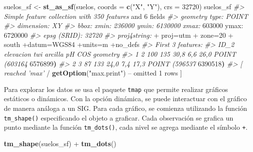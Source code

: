 \documentclass[11pt,b5paper,]{krantz}
\newenvironment{Shaded}{}{}
\newcommand{\KeywordTok}[1]{\textcolor[rgb]{0.00,0.44,0.13}{\textbf{#1}}}
\newcommand{\DataTypeTok}[1]{\textcolor[rgb]{0.56,0.13,0.00}{#1}}
\newcommand{\DecValTok}[1]{\textcolor[rgb]{0.25,0.63,0.44}{#1}}
\newcommand{\StringTok}[1]{\textcolor[rgb]{0.25,0.44,0.63}{#1}}
\newcommand{\CommentTok}[1]{\textcolor[rgb]{0.38,0.63,0.69}{\textit{#1}}}
\newcommand{\OperatorTok}[1]{\textcolor[rgb]{0.40,0.40,0.40}{#1}}
\newcommand{\ErrorTok}[1]{\textcolor[rgb]{1.00,0.00,0.00}{\textbf{#1}}}
\newcommand{\NormalTok}[1]{#1}
\begin{document}
\begin{Shaded}
\begin{Highlighting}[]
\NormalTok{suelos_sf <-}\StringTok{ }\KeywordTok{st_as_sf}\NormalTok{(suelos, }
                      \DataTypeTok{coords =} \KeywordTok{c}\NormalTok{(}\StringTok{"X"}\NormalTok{, }\StringTok{"Y"}\NormalTok{), }
                      \DataTypeTok{crs =} \DecValTok{32720}\NormalTok{)}
\NormalTok{suelos_sf}
\CommentTok{#> Simple feature collection with 350 features}
\NormalTok{and }\DecValTok{6}\NormalTok{ fields}
\CommentTok{#> geometry type: POINT}
\CommentTok{#> dimension: XY}
\CommentTok{#> bbox: xmin: 236000 ymin: 6130000 xmax:}
\DecValTok{603000}\NormalTok{ ymax}\OperatorTok{:}\StringTok{ }\DecValTok{6720000}
\CommentTok{#> epsg (SRID): 32720}
\CommentTok{#> proj4string: }
    \OperatorTok{+}\StringTok{ }\NormalTok{proj=utm }
    \OperatorTok{+}\StringTok{ }\NormalTok{zone=}\DecValTok{20} 
    \OperatorTok{+}\StringTok{ }\NormalTok{south}
\OperatorTok{+}\NormalTok{datum=WGS84 }\OperatorTok{+}\NormalTok{units=m }\OperatorTok{+}\NormalTok{no_defs}
\CommentTok{#> First 3 features:}
\CommentTok{#> ID_2 elevacion twi arcilla pH COS geometry}
\CommentTok{#> 1 2 100 135 30,8 6,6 26,0 POINT (603164}
\DecValTok{6576899}\ErrorTok{)}
\CommentTok{#> 2 3 87 133 24,0 7,4 17,3 POINT (596537}
\DecValTok{6390518}\ErrorTok{)}
\CommentTok{#> [ reached 'max'}
    \OperatorTok{/}\StringTok{ }\KeywordTok{getOption}\NormalTok{(}\StringTok{"max.print"}\NormalTok{) }\OperatorTok{--}
\NormalTok{omitted }\DecValTok{1}\NormalTok{ rows ]}
\end{Highlighting}
\end{Shaded}

Para explorar los datos se usa el paquete \texttt{tmap} que permite
realizar gráficos estáticos o dinámicos. Con la opción dinámica, se
puede interactuar con el gráfico de manera análoga a un SIG. Para cada
gráfico, se comienza utilizando la función \texttt{tm\_shape()}
especificando el objeto a graficar. Cada observación se grafica un punto
mediante la función \texttt{tm\_dots()}, cada nivel se agrega mediante
el símbolo \texttt{+}.

\begin{Shaded}
\begin{Highlighting}[]
\KeywordTok{tm_shape}\NormalTok{(suelos_sf) }\OperatorTok{+}\StringTok{ }
\StringTok{  }\KeywordTok{tm_dots}\NormalTok{()}
\end{Highlighting}
\end{Shaded}
\end{document}
